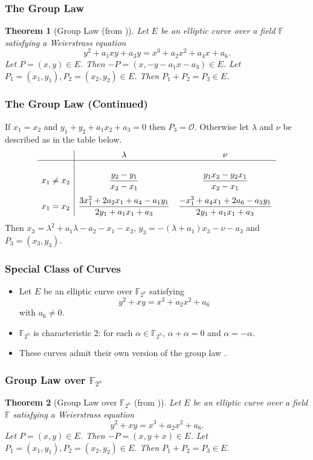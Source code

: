 \documentclass[xcolor=pdftex,dvipsnames,table]{beamer}
\theoremstyle{plain}
\newtheorem{thm}{Theorem}[section]
\theoremstyle{definition}
\def\FF{\mathbb{F}}
\begin{document}
\begin{frame}
	\frametitle{The Group Law}
	
	\begin{thm}[Group Law (from \cite{AEC})] \label{GL1}
		Let $E$ be an elliptic curve over a field $\FF$ satisfying a Weierstrass equation
		\[
		y^2+a_1xy+a_3y=x^3+a_2x^2+a_4x+a_6.
		\]
		Let $P=(x,y)\in E$.
		Then $-P=(x,-y-a_1x-a_3)\in E$.
		Let $P_1=(x_1, y_1), P_2=(x_2,y_2)\in E$.
		Then $P_1+P_2=P_3\in E$.
	\end{thm}
\end{frame}

\begin{frame}
	\frametitle{The Group Law (Continued)}
	If $x_1=x_2$ and $y_1+y_2+a_1x_2+a_3=0$ then $P_3=\mathcal{O}$.
	Otherwise let $\lambda$ and $\nu$ be described as in the table below.
	\[
	\begin{array}{c|cc}
	& \lambda & \nu\\\hline\\[.2em]
	x_1\neq x_2 & \displaystyle \frac{y_2-y_1}{x_2-x_1} & \displaystyle\frac{y_1x_2 - y_2x_1}{x_2-x_1}\\[1.2em]
	x_1=x_2 &  \displaystyle \frac{3x_1^2+2a_2x_1+a_4-a_1y_1}{2y_1+a_1x_1+a_3} & \displaystyle \frac{-x_1^3+a_4x_1+2a_6-a_3y_1}{2y_1+a_1x_1+a_3}
	\end{array}
	\]
	Then $x_3=\lambda^2+a_1\lambda-a_2-x_1-x_2$, $y_3=-(\lambda+a_1)x_3-\nu-a_3$ and $P_3=(x_3,y_3)$.
\end{frame}

\begin{frame}
	\frametitle{Special Class of Curves}
	\begin{itemize}
		\item Let $E$ be an elliptic curve over $\FF_{2^n}$ satisfying
		\[
		y^2+xy=x^3+a_2x^2+a_6
		\]
		with $a_6\neq 0$.
		
		\item $\FF_{2^n}$ is characteristic 2: for each $\alpha\in\FF_{2^n}$, $\alpha+\alpha=0$ and $\alpha=-\alpha$.
		
		\item These curves admit their own version of the group law \cite{IECC}.
	\end{itemize}
\end{frame}

\begin{frame}
	\frametitle{Group Law over $\FF_{2^n}$}
	
	\begin{thm}[Group Law over $\FF_{2^n}$ (from \cite{IECC})] \label{GL2}
		Let $E$ be an elliptic curve over a field $\FF$ satisfying a Weierstrass equation
		\begin{equation}\label{WEQN2}
		y^2+xy=x^3+a_2x^2+a_6.
		\end{equation}
		Let $P=(x,y)\in E$.
		Then $-P=(x,y+x)\in E$.
		Let $P_1=(x_1, y_1), P_2=(x_2,y_2)\in E$.
		Then $P_1+P_2=P_3\in E$.
	\end{thm}
\end{frame}
\end{document}
